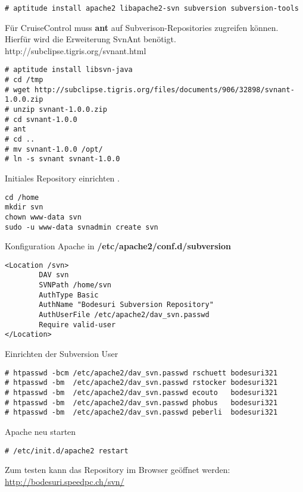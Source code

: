 \documentclass[12pt,halfparskip]{scrreprt}
\begin{document}
\begin{verbatim}
# aptitude install apache2 libapache2-svn subversion subversion-tools
\end{verbatim}

Für CruiseControl muss \textbf{ant} auf Subverison-Repositories zugreifen können. Hierfür wird die Erweiterung SvnAnt benötigt. http://subclipse.tigris.org/svnant.html

\begin{verbatim}
# aptitude install libsvn-java
# cd /tmp
# wget http://subclipse.tigris.org/files/documents/906/32898/svnant-1.0.0.zip
# unzip svnant-1.0.0.zip
# cd svnant-1.0.0
# ant
# cd ..
# mv svnant-1.0.0 /opt/
# ln -s svnant svnant-1.0.0
\end{verbatim}

Initiales Repository einrichten .

\begin{verbatim}
cd /home
mkdir svn
chown www-data svn
sudo -u www-data svnadmin create svn
\end{verbatim}

Konfiguration Apache in \textbf{/etc/apache2/conf.d/subversion}

\begin{verbatim}
<Location /svn>
        DAV svn
        SVNPath /home/svn
        AuthType Basic
        AuthName "Bodesuri Subversion Repository"
        AuthUserFile /etc/apache2/dav_svn.passwd
        Require valid-user
</Location>
\end{verbatim}

Einrichten der Subversion User

\begin{verbatim}
# htpasswd -bcm /etc/apache2/dav_svn.passwd rschuett bodesuri321
# htpasswd -bm  /etc/apache2/dav_svn.passwd rstocker bodesuri321
# htpasswd -bm  /etc/apache2/dav_svn.passwd ecouto   bodesuri321
# htpasswd -bm  /etc/apache2/dav_svn.passwd phobus   bodesuri321
# htpasswd -bm  /etc/apache2/dav_svn.passwd peberli  bodesuri321
\end{verbatim}

Apache neu starten

\begin{verbatim}
# /etc/init.d/apache2 restart
\end{verbatim}

Zum testen kann das Repository im Browser geöffnet werden:\newline
\url{http://bodesuri.speedpc.ch/svn/}

\end{document}
